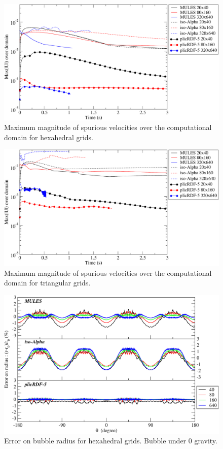 \documentclass[review]{elsarticle}
\begin{document}
\begin{figure}[!h]
  \includegraphics[width=\textwidth]{figures/spuriousCurrents_MaxmagU_compareOF_20_80_320_struct.pdf}
  \caption{Maximum magnitude of spurious velocities over the computational domain for hexahedral grids.}
  \label{fig:spuriousCurrents_MaxmagU_struct}
\end{figure}

\begin{figure}[!h]
  \includegraphics[width=\textwidth]{figures/spuriousCurrents_MaxmagU_compareOF_20_80_320_uns.pdf}
  \caption{Maximum magnitude of spurious velocities over the computational domain for triangular grids.}
  \label{fig:spuriousCurrents_MaxmagU_uns}
\end{figure}

\begin{figure}[!h]
  \includegraphics[width=\textwidth]{figures/spuriousCurrents_bubble_error_radius_struct.pdf}
  \caption{Error on bubble radius for hexahedral grids. Bubble under 0 gravity.}
  \label{fig:spuriousCurrents_bubble_error_radius_struct}
\end{figure}
\end{document}

